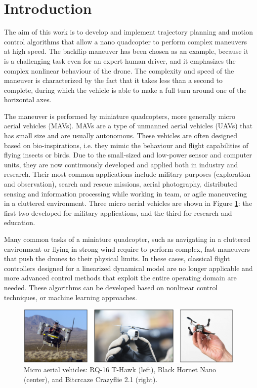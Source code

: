 \section{Introduction}
The aim of this work is to develop and implement trajectory planning and motion control algorithms that allow a nano quadcopter to perform complex maneuvers at high speed. The backflip maneuver has been chosen as an example, because it is a challenging task even for an expert human driver, and it emphasizes the complex nonlinear behaviour of the drone. The complexity and speed of the maneuver is characterized by the fact that it takes less than a second to complete, during which the vehicle is able to make a full turn around one of the horizontal axes.

The maneuver is performed by miniature quadcopters, more generally micro aerial vehicles (MAVs). MAVs are a type of unmanned aerial vehicles (UAVs) that has small size and are usually autonomous. These vehicles are often designed based on bio-inspirations, i.e. they mimic the behaviour and flight capabilities of flying insects or birds. Due to the small-sized and low-power sensor and computer units, they are now continuously developed and applied both in industry and research. Their most common applications include military purposes (exploration and observation), search and rescue missions, aerial photography, distributed sensing and information processing while working in team, or agile maneuvering in a cluttered environment. Three micro aerial vehicles are shown in Figure \ref{fig:intro}: the first two developed for military applications, and the third for research and education.

Many common tasks of a miniature quadcopter, such as navigating in a cluttered environment or flying in strong wind require to perform complex, fast maneuvers that push the drones to their physical limits. In these cases, classical flight controllers designed for a linearized dynamical model are no longer applicable and more advanced control methods that exploit the entire operating domain are needed. These algorithms can be developed based on nonlinear control techniques, or machine learning approaches.

\begin{figure}[b]
    \centering
    \includegraphics{Fig/intro.png}
    \caption{Micro aerial vehicles: RQ-16 T-Hawk (left), Black Hornet Nano (center), and Bitcrcaze Crazyflie 2.1 (right).}
    \label{fig:intro}
\end{figure}

